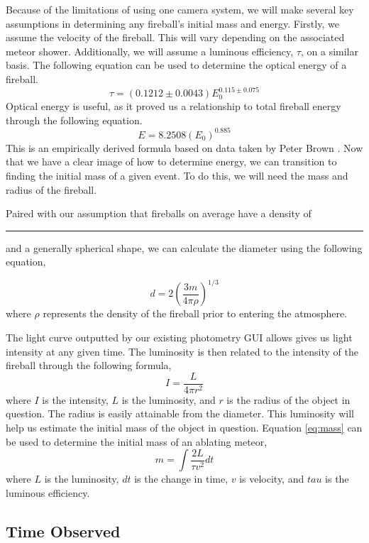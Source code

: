 Because of the limitations of using one camera system, we will make several key assumptions in determining any fireball's initial mass and energy.  
Firstly, we assume the velocity of the fireball.
This will vary depending on the associated meteor shower.
Additionally, we will assume a luminous efficiency, $\tau$, on a similar basis.
The following equation can be used to determine the optical energy of a fireball.
$$
\tau = (0.1212 \pm 0.0043)E_0^{0.115 \pm 0.075}
$$
Optical energy is useful, as it proved us a relationship to total fireball energy through the following equation.
$$ E = 8.2508(E_0)^0.885$$
This is an empirically derived formula based on data taken by Peter Brown \cite{brown_p_flux_2002}.  
Now that we have a clear image of how to determine energy, we can transition to finding the initial mass of a given event.
To do this, we will need the mass and radius of the fireball.

Paired with our assumption that fireballs on average have a density of \rule{1cm}{.1pt} and a generally spherical shape, we can calculate the diameter using the following equation,

$$d = 2(\frac{3m}{4\pi \rho})^{1/3}$$
where $\rho$ represents the density of the fireball prior to entering the atmosphere.


The light curve outputted by our existing photometry GUI allows gives us light intensity at any given time.
The luminosity is then related to the intensity of the fireball through the following formula,
$$ I = \frac{L}{4 \pi r^2}$$
where $I$ is the intensity, $L$ is the luminosity, and $r$ is the radius of the object in question.  
The radius is easily attainable from the diameter.
This luminosity will help us estimate the initial mass of the object in question.
Equation \ref{eq:mass} can be used to determine the initial mass of an ablating meteor,
\begin{equation}
m = \int \frac{2L}{\tau v^2} dt
\label{eq:mass}
\end{equation}
where $L$ is the luminosity, $dt$ is the change in time, $v$ is velocity, and $tau$ is the luminous efficiency. 


\subsection{Time Observed}

